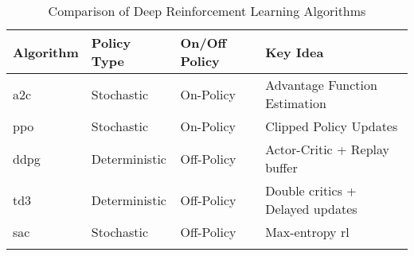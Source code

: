\begin{longtable}{|l|l|l|l|}
    \hline
    \textbf{Algorithm} & \textbf{Policy Type} & \textbf{On/Off Policy} & \textbf{Key Idea} \\
    \hline
    \endhead
    \acrshort{a2c} & Stochastic & On-Policy & Advantage Function Estimation \\ \hline
    \acrshort{ppo} & Stochastic & On-Policy & Clipped Policy Updates \\ \hline
    \acrshort{ddpg} & Deterministic & Off-Policy & Actor-Critic + Replay buffer \\ \hline
    \acrshort{td3} & Deterministic & Off-Policy & Double critics + Delayed updates \\ \hline
    \acrshort{sac} & Stochastic & Off-Policy & Max-entropy \acrshort{rl} \\ \hline
\caption{Comparison of Deep Reinforcement Learning Algorithms}
\label{tab:drl_algorithms_comparison}
\end{longtable}